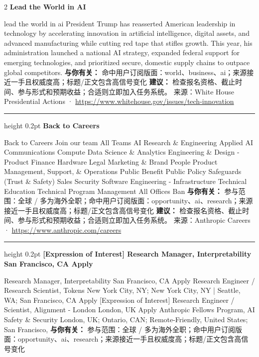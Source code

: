 \documentclass[10.5pt]{ctexart}
\begin{document}
\begin{multicols}{2}
{\large\bfseries Lead the World in AI}\par
lead the world in ai President Trump has reasserted American leadership in technology by accelerating innovation in artificial intelligence, digital assets, and advanced manufacturing while cutting red tape that stifles growth. This year, his administration launched a national AI strategy, expanded federal support for emerging technologies, and prioritized secure, domestic supply chains to outpace global competitors.
\textbf{与你有关：} 命中用户订阅版面：world、business、ai；来源接近一手且权威度高；标题/正文包含高信号变化
\textbf{建议：} 检查报名资格、截止时间、参与形式和预期收益；合适则立即加入任务系统。
{\footnotesize\color{ormuted} 来源：White House Presidential Actions · \url{https://www.whitehouse.gov/issues/tech-innovation}}
\vspace{2mm}
\hrule height 0.2pt
\vspace{2mm}
{\large\bfseries Back to Careers}\par
Back to Careers Join our team All Teams AI Research \& Engineering Applied AI Communications Compute Data Science \& Analytics Engineering \& Design - Product Finance Hardware Legal Marketing \& Brand People Product Management, Support, \& Operations Public Benefit Public Policy Safeguards (Trust \& Safety) Sales Security Software Engineering - Infrastructure Technical Education Technical Program Management All Offices Ban
\textbf{与你有关：} 参与范围：全球 / 多为海外全职；命中用户订阅版面：opportunity、ai、research；来源接近一手且权威度高；标题/正文包含高信号变化
\textbf{建议：} 检查报名资格、截止时间、参与形式和预期收益；合适则立即加入任务系统。
{\footnotesize\color{ormuted} 来源：Anthropic Careers · \url{https://www.anthropic.com/careers}}
\vspace{2mm}
\hrule height 0.2pt
\vspace{2mm}
{\large\bfseries [Expression of Interest] Research Manager, Interpretability San Francisco, CA Apply}\par
[Expression of Interest] Research Manager, Interpretability San Francisco, CA Apply Research Engineer / Research Scientist, Tokens New York City, NY; New York City, NY | Seattle, WA; San Francisco, CA Apply [Expression of Interest] Research Engineer / Scientist, Alignment - London London, UK Apply Anthropic Fellows Program, AI Safety \& Security London, UK; Ontario, CAN; Remote-Friendly, United States; San Francisco, 
\textbf{与你有关：} 参与范围：全球 / 多为海外全职；命中用户订阅版面：opportunity、ai、research；来源接近一手且权威度高；标题/正文包含高信号变化

\end{multicols}
\end{document}
